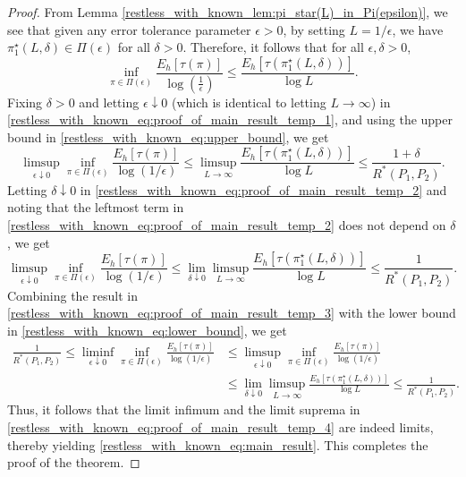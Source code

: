 \begin{proof}
From Lemma \ref{restless_with_known_lem:pi_star(L)_in_Pi(epsilon)}, we see that given any error tolerance parameter $\epsilon>0$, by setting $L=1/\epsilon$, we have $\pi_1^\star(L, \delta)\in \Pi(\epsilon)$ for all $\delta>0$. Therefore, it follows that for all $\epsilon, \delta>0$,  
\begin{equation}
\inf\limits_{\pi \in \Pi(\epsilon)} \frac{E_h[\tau(\pi)]}{\log \left(\frac{1}{\epsilon}\right)} \leq \frac{E_h[\tau(\pi_1^\star(L, \delta))]}{\log L}. 
\label{restless_with_known_eq:proof_of_main_result_temp_1}
\end{equation}
Fixing $\delta>0$ and letting $\epsilon\downarrow 0$ (which is identical to letting $L\to \infty$) in \eqref{restless_with_known_eq:proof_of_main_result_temp_1}, and using the upper bound in \eqref{restless_with_known_eq:upper_bound}, we get
\begin{equation}
\limsup\limits_{\epsilon\downarrow 0}\inf\limits_{\pi\in\Pi(\epsilon)}\frac{E_h[\tau(\pi)]}{\log(1/\epsilon)} \leq \limsup\limits_{L\to\infty}\frac{E_h[\tau(\pi_1^\star(L, \delta))]}{\log L}\leq \frac{1+\delta}{R^*(P_1,P_2)}.
\label{restless_with_known_eq:proof_of_main_result_temp_2}
\end{equation}
Letting $\delta\downarrow 0$ in \eqref{restless_with_known_eq:proof_of_main_result_temp_2} and noting that the leftmost term in \eqref{restless_with_known_eq:proof_of_main_result_temp_2} does not depend on $\delta$, we get 
\begin{equation}
\limsup\limits_{\epsilon\downarrow 0}\inf\limits_{\pi\in\Pi(\epsilon)}\frac{E_h[\tau(\pi)]}{\log(1/\epsilon)} \leq \lim\limits_{\delta \downarrow 0}\limsup\limits_{L\to\infty}\frac{E_h[\tau(\pi_1^\star(L, \delta))]}{\log L}\leq \frac{1}{R^*(P_1,P_2)}.
\label{restless_with_known_eq:proof_of_main_result_temp_3}
\end{equation}
Combining the result in \eqref{restless_with_known_eq:proof_of_main_result_temp_3} with the lower bound in \eqref{restless_with_known_eq:lower_bound}, we get
\begingroup\allowdisplaybreaks\begin{align}
\frac{1}{R^*(P_1,P_2)} \leq \liminf\limits_{\epsilon\downarrow 0}\inf\limits_{\pi\in\Pi(\epsilon)}\frac{E_h[\tau(\pi)]}{\log(1/\epsilon)} &\leq \limsup\limits_{\epsilon\downarrow 0}\inf\limits_{\pi\in\Pi(\epsilon)}\frac{E_h[\tau(\pi)]}{\log(1/\epsilon)} \nonumber\\
&\leq \lim\limits_{\delta \downarrow 0}\limsup\limits_{L\to\infty}\frac{E_h[\tau(\pi_1^\star(L, \delta))]}{\log L}\leq \frac{1}{R^*(P_1,P_2)}.
\label{restless_with_known_eq:proof_of_main_result_temp_4}
\end{align}\endgroup
Thus, it follows that the limit infimum and the limit suprema in \eqref{restless_with_known_eq:proof_of_main_result_temp_4} are indeed limits, thereby yielding \eqref{restless_with_known_eq:main_result}. This completes the proof of the theorem.
\end{proof}

